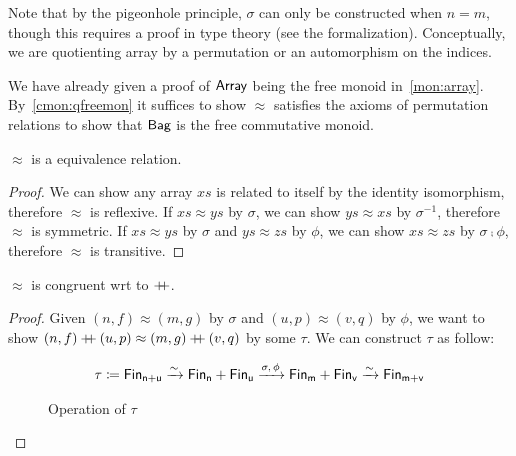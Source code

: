 Note that by the pigeonhole principle, $\sigma$ can only be constructed when $n = m$, though this requires a proof in
type theory (see the formalization).
%
Conceptually, we are quotienting array by a permutation or an automorphism on the indices.

We have already given a proof of $\operatorname{\mathsf{Array}}$ being the free monoid in~\cref{mon:array}.
%
By~\cref{cmon:qfreemon} it suffices to show $\approx$ satisfies the axioms of permutation relations to show that $\operatorname{\mathsf{Bag}}$
is the free commutative monoid.

\begin{proposition}
    $\approx$ is a equivalence relation.
\end{proposition}

\begin{proof}
    We can show any array $xs$ is related to itself by the identity isomorphism, therefore $\approx$ is reflexive.
    If $xs \approx ys$ by $\sigma$, we can show $ys \approx xs$ by $\sigma^{-1}$, therefore $\approx$ is symmetric.
    If $xs \approx ys$ by $\sigma$ and $ys \approx zs$ by $\phi$, we can show $xs \approx zs$ by $\sigma \comp \phi$,
    therefore $\approx$ is transitive.
\end{proof}

\begin{proposition}\label{bag:cong}
    $\approx$ is congruent wrt to $\mathbin{+\kern -0.4em+}$.
\end{proposition}

\begin{proof}
    Given $(n, f) \approx (m, g)$ by $\sigma$ and $(u, p) \approx (v, q)$ by $\phi$,
    we want to show $(n, f) \mathbin{+\kern -0.4em+} (u, p) \approx (m, g) \mathbin{+\kern -0.4em+} (v, q)$ by some $\tau$.
    We can construct $\tau$ as follow:

    \begin{align*}
        \tau \defeq \Fin[n+u] \xto{\sim} \Fin[n] + \Fin[u] \xto{\sigma,\,\phi} \Fin[m] + \Fin[v] \xto{\sim} \Fin[m+v] \\
    \end{align*}

    \begin{figure}[H]
        \centering
        \caption{Operation of $\tau$}
        \label{fig:enter-label}
    \end{figure}

\end{proof}


